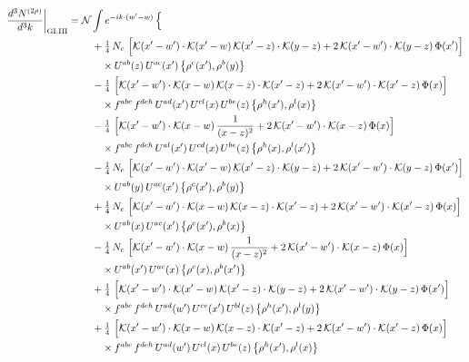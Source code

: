 \documentclass[10pt]{article}
\numberwithin{equation}{section}
\newcommand{\KK}{\mathcal K}
\newcommand{\NN}{\mathcal N}
\begin{document}
\begin{align}
\frac{d^3N^{(2\rho)}}{d^3k}\bigg|_{\rm GI.III}={}&\NN\int e^{-ik\cdot(w'-w)}\,\Big\{\notag\\
&\quad +\tfrac14\,N_{c}\,\,\Big[\KK(x'-w')\cdot\KK(x'-w)\,\KK(x'-z)\cdot\KK(y-z)+2\,\KK(x'-w')\cdot\KK(y-z)\,\Phi(x')\Big]\notag\\
&\qquad\times U^{ab}(z)\,U^{ac}(x')\,\big\{\rho^{c}(x'),\rho^{b}(y)\big\}\notag\\
&\quad -\tfrac14\,\,\Big[\KK(x'-w')\cdot\KK(x-w)\,\KK(x-z)\cdot\KK(x'-z)+2\,\KK(x'-w')\cdot\KK(x'-z)\,\Phi(x)\Big]\notag\\
&\qquad\times f^{abc}\,f^{deh}\,U^{ad}(x')\,U^{cl}(x)\,U^{be}(z)\,\big\{\rho^{h}(x'),\rho^{l}(x)\big\}\notag\\
&\quad -\tfrac14\,\,\Big[\KK(x'-w')\cdot\KK(x-w)\,\frac{1}{(x-z)^2}+2\,\KK(x'-w')\cdot\KK(x-z)\,\Phi(x)\Big]\notag\\
&\qquad\times f^{abc}\,f^{deh}\,U^{al}(x')\,U^{cd}(x)\,U^{be}(z)\,\big\{\rho^{h}(x),\rho^{l}(x')\big\}\notag\\
&\quad -\tfrac14\,N_{c}\,\,\Big[\KK(x'-w')\cdot\KK(x'-w)\,\KK(x'-z)\cdot\KK(y-z)+2\,\KK(x'-w')\cdot\KK(y-z)\,\Phi(x')\Big]\notag\\
&\qquad\times U^{ab}(y)\,U^{ac}(x')\,\big\{\rho^{c}(x'),\rho^{b}(y)\big\}\notag\\
&\quad +\tfrac14\,N_{c}\,\,\Big[\KK(x'-w')\cdot\KK(x-w)\,\KK(x-z)\cdot\KK(x'-z)+2\,\KK(x'-w')\cdot\KK(x'-z)\,\Phi(x)\Big]\notag\\
&\qquad\times U^{ab}(x)\,U^{ac}(x')\,\big\{\rho^{c}(x'),\rho^{b}(x)\big\}\notag\\
&\quad -\tfrac14\,N_{c}\,\,\Big[\KK(x'-w')\cdot\KK(x-w)\,\frac{1}{(x-z)^2}+2\,\KK(x'-w')\cdot\KK(x-z)\,\Phi(x)\Big]\notag\\
&\qquad\times U^{ab}(x')\,U^{ac}(x)\,\big\{\rho^{c}(x),\rho^{b}(x')\big\}\notag\\
&\quad +\tfrac14\,\,\Big[\KK(x'-w')\cdot\KK(x'-w)\,\KK(x'-z)\cdot\KK(y-z)+2\,\KK(x'-w')\cdot\KK(y-z)\,\Phi(x')\Big]\notag\\
&\qquad\times f^{abc}\,f^{deh}\,U^{ad}(w')\,U^{ce}(x')\,U^{bl}(z)\,\big\{\rho^{h}(x'),\rho^{l}(y)\big\}\notag\\
&\quad +\tfrac14\,\,\Big[\KK(x'-w')\cdot\KK(x-w)\,\KK(x-z)\cdot\KK(x'-z)+2\,\KK(x'-w')\cdot\KK(x'-z)\,\Phi(x)\Big]\notag\\
&\qquad\times f^{abc}\,f^{deh}\,U^{ad}(w')\,U^{cl}(x)\,U^{be}(z)\,\big\{\rho^{h}(x'),\rho^{l}(x)\big\}\notag\\

\end{align}
\end{document}
